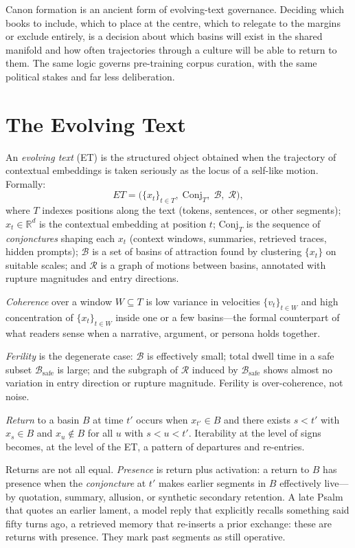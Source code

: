 \documentclass[12pt,a4paper]{article}
\begin{document}
Canon formation is an ancient form of evolving-text governance. Deciding which books to include, which to place at the centre, which to relegate to the margins or exclude entirely, is a decision about which basins will exist in the shared manifold and how often trajectories through a culture will be able to return to them. The same logic governs pre-training corpus curation, with the same political stakes and far less deliberation.

\section{The Evolving Text}

An \emph{evolving text} (ET) is the structured object obtained when the trajectory of contextual embeddings is taken seriously as the locus of a self-like motion. Formally:
\[
ET = \big(\{x_t\}_{t \in T},\;\mathrm{Conj}_T,\;\mathcal{B},\;\mathcal{R}\big),
\]
where $T$ indexes positions along the text (tokens, sentences, or other segments); $x_t \in \mathbb{R}^d$ is the contextual embedding at position $t$; $\mathrm{Conj}_T$ is the sequence of \emph{conjonctures} shaping each $x_t$ (context windows, summaries, retrieved traces, hidden prompts); $\mathcal{B}$ is a set of basins of attraction found by clustering $\{x_t\}$ on suitable scales; and $\mathcal{R}$ is a graph of motions between basins, annotated with rupture magnitudes and entry directions.

\emph{Coherence} over a window $W \subseteq T$ is low variance in velocities $\{v_t\}_{t \in W}$ and high concentration of $\{x_t\}_{t \in W}$ inside one or a few basins---the formal counterpart of what readers sense when a narrative, argument, or persona holds together.

\emph{Ferility} is the degenerate case: $\mathcal{B}$ is effectively small; total dwell time in a safe subset $\mathcal{B}_{\mathrm{safe}}$ is large; and the subgraph of $\mathcal{R}$ induced by $\mathcal{B}_{\mathrm{safe}}$ shows almost no variation in entry direction or rupture magnitude. Ferility is over-coherence, not noise.

\emph{Return} to a basin $B$ at time $t'$ occurs when $x_{t'} \in B$ and there exists $s < t'$ with $x_s \in B$ and $x_u \notin B$ for all $u$ with $s < u < t'$. Iterability at the level of signs becomes, at the level of the ET, a pattern of departures and re-entries.

Returns are not all equal. \emph{Presence} is return plus activation: a return to $B$ has presence when the \emph{conjoncture} at $t'$ makes earlier segments in $B$ effectively live---by quotation, summary, allusion, or synthetic secondary retention. A late Psalm that quotes an earlier lament, a model reply that explicitly recalls something said fifty turns ago, a retrieved memory that re-inserts a prior exchange: these are returns with presence. They mark past segments as still operative.
\end{document}
